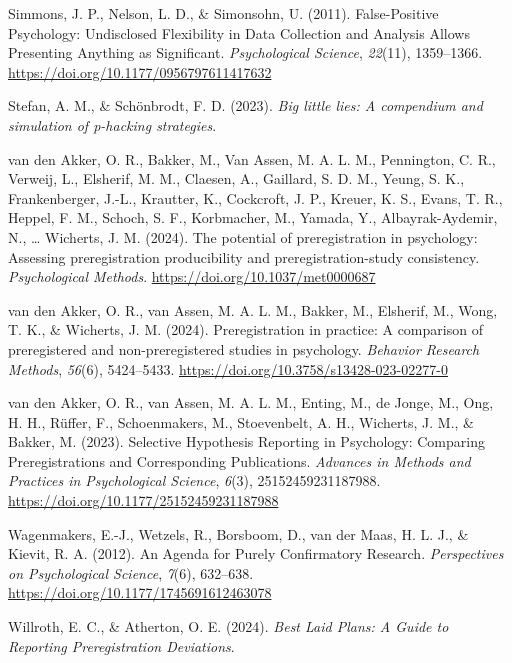 \documentclass[
  man,
  floatsintext,
  longtable,
  nolmodern,
  notxfonts,
  notimes,
  colorlinks=true,linkcolor=blue,citecolor=blue,urlcolor=blue]{apa7}
\newlength{\cslhangindent}
\newenvironment{CSLReferences}[2] %
 {\begin{list}{}{%
  \setlength{\itemindent}{0pt}
  \setlength{\leftmargin}{0pt}
  \setlength{\parsep}{0pt}
  \ifodd #1
   \setlength{\leftmargin}{\cslhangindent}
   \setlength{\itemindent}{-1\cslhangindent}
  \fi
  \setlength{\itemsep}{#2\baselineskip}}}
 {\end{list}}
\begin{document}
\begin{CSLReferences}{1}{0}
Simmons, J. P., Nelson, L. D., \& Simonsohn, U. (2011). False-{Positive
Psychology}: {Undisclosed Flexibility} in {Data Collection} and
{Analysis Allows Presenting Anything} as {Significant}.
\emph{Psychological Science}, \emph{22}(11), 1359--1366.
\url{https://doi.org/10.1177/0956797611417632}

Stefan, A. M., \& Schönbrodt, F. D. (2023). \emph{Big little lies: A
compendium and simulation of p-hacking strategies}.

van den Akker, O. R., Bakker, M., Van Assen, M. A. L. M., Pennington, C.
R., Verweij, L., Elsherif, M. M., Claesen, A., Gaillard, S. D. M.,
Yeung, S. K., Frankenberger, J.-L., Krautter, K., Cockcroft, J. P.,
Kreuer, K. S., Evans, T. R., Heppel, F. M., Schoch, S. F., Korbmacher,
M., Yamada, Y., Albayrak-Aydemir, N., \ldots{} Wicherts, J. M. (2024).
The potential of preregistration in psychology: {Assessing}
preregistration producibility and preregistration-study consistency.
\emph{Psychological Methods}. \url{https://doi.org/10.1037/met0000687}

van den Akker, O. R., van Assen, M. A. L. M., Bakker, M., Elsherif, M.,
Wong, T. K., \& Wicherts, J. M. (2024). Preregistration in practice: {A}
comparison of preregistered and non-preregistered studies in psychology.
\emph{Behavior Research Methods}, \emph{56}(6), 5424--5433.
\url{https://doi.org/10.3758/s13428-023-02277-0}

van den Akker, O. R., van Assen, M. A. L. M., Enting, M., de Jonge, M.,
Ong, H. H., Rüffer, F., Schoenmakers, M., Stoevenbelt, A. H., Wicherts,
J. M., \& Bakker, M. (2023). Selective {Hypothesis Reporting} in
{Psychology}: {Comparing Preregistrations} and {Corresponding
Publications}. \emph{Advances in Methods and Practices in Psychological
Science}, \emph{6}(3), 25152459231187988.
\url{https://doi.org/10.1177/25152459231187988}

Wagenmakers, E.-J., Wetzels, R., Borsboom, D., van der Maas, H. L. J.,
\& Kievit, R. A. (2012). An {Agenda} for {Purely Confirmatory Research}.
\emph{Perspectives on Psychological Science}, \emph{7}(6), 632--638.
\url{https://doi.org/10.1177/1745691612463078}

Willroth, E. C., \& Atherton, O. E. (2024). \emph{Best {Laid Plans}: {A
Guide} to {Reporting Preregistration Deviations}}.

\end{CSLReferences}
\end{document}
